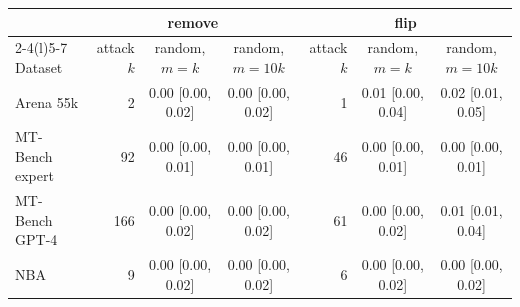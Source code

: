 {\scriptsize\setlength{\tabcolsep}{3pt}\begin{tabular}{@{}lrccrcc@{}}\toprule
 & \multicolumn{3}{c}{remove} & \multicolumn{3}{c}{flip}\\
\cmidrule(lr){2-4}\cmidrule(l){5-7}
Dataset & attack $k$ & random, $m{=}k$ & random, $m{=}10k$ & attack $k$ & random, $m{=}k$ & random, $m{=}10k$\\\midrule
Arena 55k & 2 & 0.00 [0.00, 0.02] & 0.00 [0.00, 0.02] & 1 & 0.01 [0.00, 0.04] & 0.02 [0.01, 0.05] \\
MT-Bench expert & 92 & 0.00 [0.00, 0.01] & 0.00 [0.00, 0.01] & 46 & 0.00 [0.00, 0.01] & 0.00 [0.00, 0.01] \\
MT-Bench GPT-4 & 166 & 0.00 [0.00, 0.02] & 0.00 [0.00, 0.02] & 61 & 0.00 [0.00, 0.02] & 0.01 [0.01, 0.04] \\
NBA & 9 & 0.00 [0.00, 0.02] & 0.00 [0.00, 0.02] & 6 & 0.00 [0.00, 0.02] & 0.00 [0.00, 0.02] \\
\bottomrule\end{tabular}}
